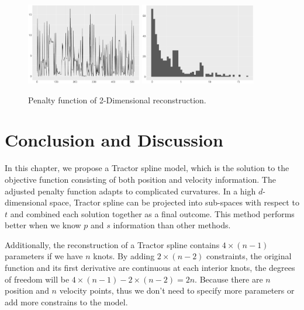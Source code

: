 \begin{figure}
  \centering
    \includegraphics[width=0.45\textwidth]{Chapters/02TractorSplineTheory/plot/ggplot/ggRealdataXYPenaltyLine}
    \includegraphics[width=0.45\textwidth]{Chapters/02TractorSplineTheory/plot/ggplot/ggRealdataXYPenaltyHist} 
  \caption{Penalty function of 2-Dimensional reconstruction.}\label{2dpenalty}
\end{figure}


\clearpage

\section{Conclusion and Discussion}

In this chapter, we propose a Tractor spline model, which is the solution to the objective function consisting of both position and velocity information. The adjusted penalty function adapts to complicated curvatures. In a high $d$-dimensional space, Tractor spline can be projected into sub-spaces with respect to $t$ and combined each solution together as a final outcome. This method performs better when we know $p$ and $s$ information than other methods. 


Additionally, the reconstruction of a Tractor spline contains $4\times (n-1)$ parameters if we have $n$ knots. By adding $2\times (n-2)$ constraints, the original function and its first derivative are continuous at each interior knots, the degrees of freedom will be $4\times (n-1)-2\times (n-2)=2n$. Because there are $n$ position and $n$ velocity points, thus we don't need to specify more parameters or add more constrains to the model. 

